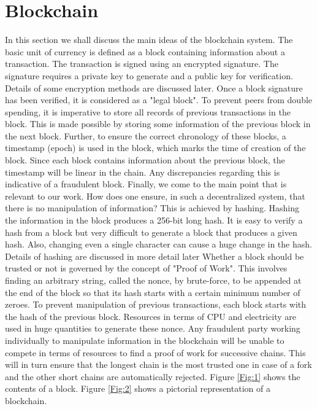 \section{Blockchain}
In this section we shall discuss the main ideas of the blockchain system\cite{btc}. The basic unit of currency is defined as a block containing information about a transaction. The transaction is signed using an encrypted signature. The signature requires a private key to generate and a public key for verification. Details of some encryption methods are discussed later. %
Once a block signature has been verified, it is considered as a "legal block". To prevent peers from double spending, it is imperative to store all records of previous transactions in the block. This is made possible by storing some information of the previous block in the next block. Further, to ensure the correct chronology of these blocks, a timestamp (epoch) is used in the block, which marks the time of creation of the block. Since each block contains information about the previous block, the timestamp will be linear in the chain. Any discrepancies regarding this is indicative of a fraudulent block. Finally, we come to the main point that is relevant to our work. How does one ensure, in such a decentralized system, that there is no manipulation of information? This is achieved by hashing. Hashing the information in the block produces a 256-bit long hash. It is easy to verify a hash from a block but very difficult to generate a block that produces a given hash\cite{SHA}. Also, changing even a single character can cause a huge change in the hash. Details of hashing are discussed in more detail later %
Whether a block should be trusted or not is governed by the concept of "Proof of Work". This involves finding an arbitrary string, called the nonce, by brute-force, to be appended at the end of the block so that its hash starts with a certain minimum number of zeroes. To prevent manipulation of previous transactions, each block starts with the hash of the previous block. Resources in terms of CPU and electricity are used in huge quantities to generate these nonce. Any fraudulent party working individually to manipulate information in the blockchain will be unable to compete in terms of resources to find a proof of work for successive chains. This will in turn ensure that the longest chain is the most trusted one in case of a fork and the other short chains are automatically rejected. Figure \ref{Fig:1} shows the contents of a block. Figure \ref{Fig:2} shows a pictorial representation of a blockchain.\\

